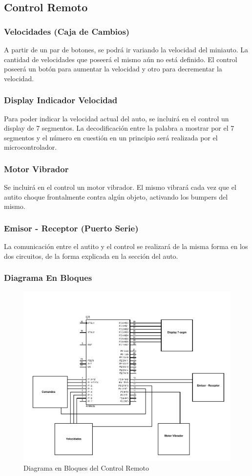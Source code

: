 \documentclass[a4paper,10pt]{article}
\begin{document}
		\subsection{Control Remoto}
			\subsubsection{Velocidades (Caja de Cambios)}
				A partir de un par de botones, se podrá ir variando la velocidad del miniauto. La cantidad de velocidades que poseerá el mismo aún no está definido.
				El control poseerá un botón para aumentar la velocidad y otro para decrementar la velocidad.
			\subsubsection{Display Indicador Velocidad}
				Para poder indicar la velocidad actual del auto, se incluirá en el control un display de 7 segmentos. La decodificación entre la palabra a mostrar
				por el 7 segmentos y el número en cuestión en un principio será realizada por el microcontrolador. 
			\subsubsection{Motor Vibrador}
				Se incluirá en el control un motor vibrador. El mismo vibrará cada vez que el autito choque frontalmente contra algún objeto, activando los bumpers
				del mismo. 
			\subsubsection{Emisor - Receptor (Puerto Serie)}
				La comunicación entre el autito y el control se realizará de la misma forma en los dos circuitos, de la forma explicada en la sección del auto.
			\subsubsection{Diagrama En Bloques}
				\begin{figure}[!htb]
						\centering
						\includegraphics[width=13cm]{Imagenes/DiagramaControl.pdf}
						\caption{Diagrama en Bloques del Control Remoto} \label{img002}
					\end{figure}
	
\end{document}
